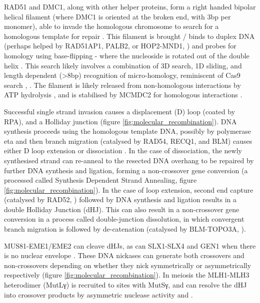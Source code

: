 RAD51 and DMC1, along with other helper proteins, form a right handed bipolar helical filament (where DMC1 is oriented at the broken end, with 3bp per monomer), able to invade the homologous chromosome to search for a homologous template for repair \parencite{Sehorn2004Human, Cloud2012Rad51, Brown2015Small, Brown2015DNA, Crickard2018Spontaneous}. This filament is brought / binds to duplex DNA (perhaps helped by RAD51AP1, PALB2, or HOP2-MND1, \cite{Petukhova2005Hop2}) and probes for homology using base-flipping - where the nucleoside is rotated out of the double helix \parencite{Gupta1999Rapid, Folta-Stogniew2004Exchange}. This search likely involves a combination of 3D search, 1D sliding, and length dependent (>8bp) recognition of micro-homology, reminiscent of Cas9 search \parencite{Ragunathan2012RecA,Forget2012Singlemolecule,Renkawitz2013Monitoring,Qi2015DNA,Lee2015Base}, \parencite[reviewed in][]{Barzel2008Finding, Renkawitz2014Mechanisms, Greene2016DNA, Kaniecki2018change, Haber2018DNA}. The filament is likely released from non-homologous interactions by ATP hydrolysis \parencite{Lee2016ATP}, and is stabilised by MCMDC2 for homologous interactions \parencite{McNairn2017Repair}. 

Successful single strand invasion causes a displacement (D) loop (coated by RPA), and a Holliday junction (figure \ref{fig:molecular_recombination}). DNA synthesis proceeds using the homologous template DNA, possibly by polymerase eta \parencite{McIlwraith2005Human, Kawamoto2005Dual} and then branch migration (catalysed by RAD54, RECQ1, and BLM) causes either D loop extension or dissociation \parencite{Bugreev2006Rad54,Bugreev2008RECQ1, Mazina2012Polarity}. In the case of dissociation, the newly synthesised strand can re-anneal to the resected DNA overhang to be repaired by further DNA synthesis and ligation, forming a non-crossover gene conversion (a processed called Synthesis Dependent Strand Annealing, figure \ref{fig:molecular_recombination}). In the case of loop extension, second end capture (catalysed by RAD52, \cite{Sugiyama1998DNA, Sugiyama2006Rad52mediated, McIlwraith2008DNA, Lao2008Rad52}) followed by DNA synthesis and ligation results in a double Holliday Junction (dHJ). This can also result in a non-crossover gene conversion in a process called double-junction dissolution, in which convergent branch migration is followed by de-catenation (catalysed by BLM-TOPO3A, \cite{Wu2003Bloom, Bizard2014Dissolution}).

MUS81-EME1/EME2 can cleave dHJs, as can SLX1-SLX4 and GEN1 when there is no nuclear envelope \parencite[reviewed in][]{Wyatt2014Holliday}. These DNA nickases can generate both crossovers and non-crossovers depending on whether they nick symmetrically or asymmetrically respectively (figure \ref{fig:molecular_recombination}). In meiosis the MLH1-MLH3 heterodimer (MutLγ) is recruited to sites with MutSγ, and can resolve the dHJ into crossover products by asymmetric nuclease activity \parencite{Zakharyevich2012Delineation} and \parencite[reviewed in][]{Hunter2015Meiotic, Gray2016Control, Manhart2016Roles, Toledo2019mutation}. 

